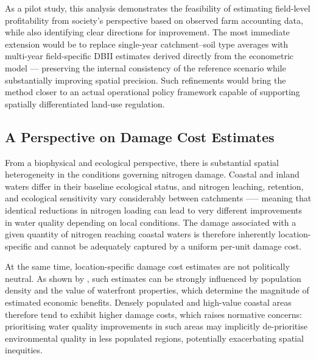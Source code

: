 \documentclass[12pt]{article}
\begin{document}
As a pilot study, this analysis demonstrates the feasibility of estimating field-level profitability from society's perspective based on observed farm accounting data, while also identifying clear directions for improvement. 
The most immediate extension would be to replace single-year catchment--soil type averages with multi-year field-specific DBII estimates derived directly from the econometric model --- preserving the internal consistency of the reference scenario while substantially improving spatial precision. 
Such refinements would bring the method closer to an actual operational policy framework capable of supporting spatially differentiated land-use regulation.

\subsection{A Perspective on Damage Cost Estimates}

From a biophysical and ecological perspective, there is substantial spatial heterogeneity in the conditions governing nitrogen damage. Coastal and inland waters differ in their baseline ecological status, and nitrogen leaching, retention, and ecological sensitivity vary considerably between catchments —-- meaning that identical reductions in nitrogen loading can lead to very different improvements in water quality depending on local  conditions. The damage associated with a given quantity of nitrogen reaching coastal waters is therefore inherently location-specific and cannot be adequately captured by a uniform per-unit damage cost.




At the same time, location-specific damage cost estimates are not politically neutral. As shown by \cite{andersen2019}, such estimates can be strongly influenced by population density and the value of waterfront properties, which determine the magnitude of estimated economic benefits. Densely populated and high-value coastal areas therefore tend to exhibit higher damage costs, which raises normative concerns: prioritising water quality improvements in such areas may implicitly de-prioritise environmental quality in less populated regions, potentially exacerbating spatial inequities.   




\end{document}
